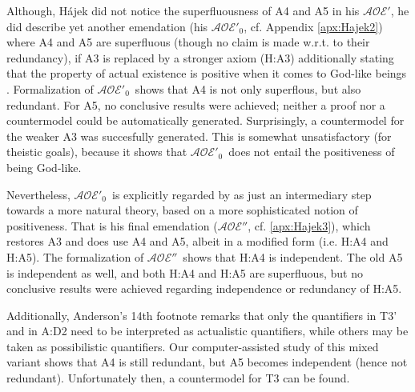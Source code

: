 \documentclass{birkjour}
\newcommand{\AOEH}{$\mathcal{AOE}'$}
\newcommand{\AOEHH}{$\mathcal{AOE}'_0$}
\newcommand{\AOEHHH}{$\mathcal{AOE}''$}
\theoremstyle{definition}
\theoremstyle{remark}
\numberwithin{equation}{section}
\begin{document}
Although, Hájek did not notice the superfluousness of A4 and A5 in his \AOEH, he did describe yet another emendation (his \AOEHH, cf. Appendix \ref{apx:Hajek2}) where A4 and A5 are superfluous (though no claim is made w.r.t. to their redundancy), if A3 is replaced by a stronger axiom (H:A3) additionally stating that the property of actual existence is positive when it comes to God-like beings \cite[sec.~5]{Hajek2002}. Formalization of \AOEHH\ shows that A4 is not only superflous, but also redundant. For A5, no conclusive results were achieved; neither a proof nor a countermodel could be automatically generated. Surprisingly, a countermodel for the weaker A3 was succesfully generated. This is somewhat unsatisfactory (for theistic goals), because it shows that \AOEHH\ does not entail the positiveness of being God-like.

Nevertheless, \AOEHH\ is explicitly regarded by \citet[p.~12]{Hajek2002} as just an intermediary step towards a more natural theory, based on a more sophisticated notion of positiveness. That is his final emendation (\AOEHHH, cf. \ref{apx:Hajek3}), which restores A3 and does use A4 and A5, albeit in a modified form (i.e. H:A4 and H:A5). The formalization of \AOEHHH\ shows that H:A4 is independent. The old A5 is independent as well, and both H:A4 and H:A5 are superfluous, but no conclusive results were achieved regarding independence or redundancy of H:A5.

Additionally, Anderson's 14th footnote \citep[footnote 14]{anderson90:_some_emend_of_goedel_ontol_proof} remarks that only the quantifiers in T3' and in A:D2 need to be interpreted as actualistic quantifiers, while others may be taken as possibilistic quantifiers. Our computer-assisted study of this mixed variant shows that A4 is still redundant, but A5 becomes independent (hence not redundant). Unfortunately then, a countermodel for T3 can be found.
\end{document}
